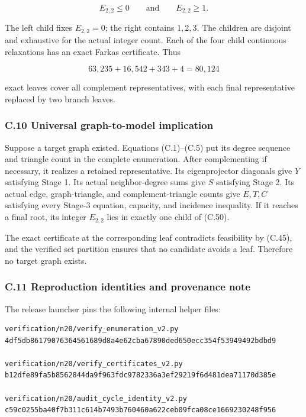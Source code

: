\documentclass[
  english,
  11pt,
  a4paper,
]{article}
\begin{document}
\[
E_{2,2}\le0\qquad\text{and}\qquad E_{2,2}\ge1.
\tag{C.50}
\]

The left child fixes \(E_{2,2}=0\); the right contains \(1,2,3\). The
children are disjoint and exhaustive for the actual integer count. Each
of the four child continuous relaxations has an exact Farkas
certificate. Thus

\[
63{,}235+16{,}542+343+4=80{,}124
\tag{C.51}
\]

exact leaves cover all complement representatives, with each final
representative replaced by two branch leaves.

\subsubsection{C.10 Universal graph-to-model
implication}\label{c.10-universal-graph-to-model-implication}

Suppose a target graph existed. Equations (C.1)--(C.5) put its degree
sequence and triangle count in the complete enumeration. After
complementing if necessary, it realizes a retained representative. Its
eigenprojector diagonals give \(Y\) satisfying Stage 1. Its actual
neighbor-degree sums give \(S\) satisfying Stage 2. Its actual edge,
graph-triangle, and complement-triangle counts give \(E,T,C\) satisfying
every Stage-3 equation, capacity, and incidence inequality. If it
reaches a final root, its integer \(E_{2,2}\) lies in exactly one child
of (C.50).

The exact certificate at the corresponding leaf contradicts feasibility
by (C.45), and the verified set partition ensures that no candidate
avoids a leaf. Therefore no target graph exists.

\subsubsection{C.11 Reproduction identities and provenance
note}\label{c.11-reproduction-identities-and-provenance-note}

The release launcher pins the following internal helper files:

\begin{verbatim}
verification/n20/verify_enumeration_v2.py
4df5db86179076364561689d8a4e62cba67890ded650ecc354f53949492bdbd9

verification/n20/verify_certificates_v2.py
b12dfe89fa5b8562844da9f963fdc9782336a3ef29219f6d481dea71170d385e

verification/n20/audit_cycle_identity_v2.py
c59c0255ba40f7b311c614b7493b760460a622ceb09fca08ce1669230248f956
\end{verbatim}
\end{document}
